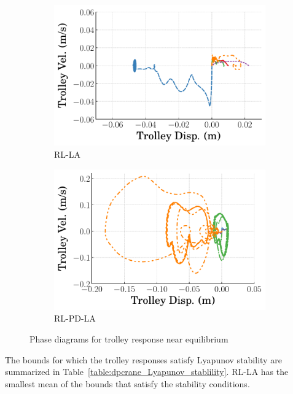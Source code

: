 \begin{figure}[tb]
\begin{subfigure}[b]{0.49\textwidth}
    \centering
    \includegraphics[width=\textwidth]{figures/figures_stability/time_responses_crane/dpcrane_RL_LA/dpcrane_RL_LA_trolley_phase_plots.pdf}
    \caption{RL-LA}
    \label{subfig_chap3:dpcrane_RL_LA_phase_trolley}
  \end{subfigure}
  \hfill
  \begin{subfigure}[b]{0.49\textwidth}
      \centering
      \includegraphics[width=\textwidth]{figures/figures_stability/time_responses_crane/dpcrane_RL_PD_LA/dpcrane_RL_PD_LA_trolley_phase_plots.pdf}
      \caption{RL-PD-LA}
      \label{subfig_chap3:dpcrane_RL_PD_LA_phase_trolley}
  \end{subfigure}
  \hfill
  \caption{Phase diagrams for trolley response near equilibrium}
  \label{fig_chap3:dpcrane_near_equil_phase_trolley}
\end{figure}
%
The bounds for which the trolley responses satisfy Lyapunov stability are summarized in Table~\ref{table:dpcrane_Lyapunov_stablility}. RL-LA has the smallest mean of the bounds that satisfy the stability conditions.
